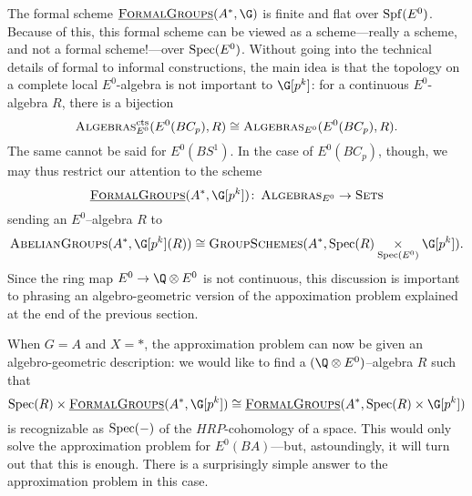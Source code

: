 The formal scheme \(\InternalHom{FormalGroups}(A^*,\G)\) is finite and flat over \(\operatorname{Spf}(E^0)\). Because of this, this formal scheme can be viewed as a scheme---really a scheme, and not a formal scheme!---over \(\operatorname{Spec}(E^0)\). Without going into the technical details of formal to informal constructions, the main idea is that the topology on a complete local \(E^0\)-algebra is not important to \(\G[p^k]\): for a continuous \(E^0\)-algebra \(R\), there is a bijection
\[
\normalfont\textsc{Algebras}_{E^0}^{\mathrm{cts}}(E^0(BC_p),R) \cong \normalfont\textsc{Algebras}_{E^0}(E^0(BC_p),R).
\]
The same cannot be said for \(E^0(BS^1)\).  In the case of \(E^0(BC_p)\), though, we may thus restrict our attention to the scheme
\[
\InternalHom{FormalGroups}(A^*,\G[p^k]) \co \CatOf{Algebras}_{E^0} \rightarrow \CatOf{Sets}
\]
sending an \(E^0\)--algebra \(R\) to
\[
\CatOf{AbelianGroups}(A^*, \G[p^k](R)) \cong \CatOf{GroupSchemes}(A^*, \Spec(R) \underset{{\Spec(E^0)}}{\times} \G[p^k]).
\]
Since the ring map \(E^0 \rightarrow \Q \otimes E^0\) is not continuous, this discussion is important to phrasing an algebro-geometric version of the appoximation problem explained at the end of the previous section.

When \(G = A\) and \(X = *\), the approximation problem can now be given an algebro-geometric description: we would like to find a \((\Q \otimes E^0)\)--algebra \(R\) such that 
\[
\Spec(R) \times \InternalHom{FormalGroups}(A^*, \G[p^k]) \cong  \InternalHom{FormalGroups}(A^*, \Spec(R) \times \G[p^k])
\]
is recognizable as \(\operatorname{Spec}(-)\) of the \(HRP\)-cohomology of a space. This would only solve the approximation problem for \(E^0(BA)\)---but, astoundingly, it will turn out that this is enough. There is a surprisingly simple answer to the approximation problem in this case. 

